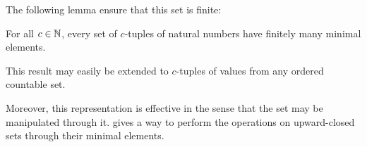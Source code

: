 The following lemma ensure that this set is finite:
\begin{lemm}
  \label{theo:dickson}
  For all $c \in \mathbb{N}$, every set of $c$-tuples of natural numbers have finitely many minimal elements.
\end{lemm}
This result may easily be extended to $c$-tuples of values from any ordered countable set.

Moreover, this representation is effective in the sense that the set may be manipulated through it.
\cite{Ganty09} gives a way to perform the operations on upward-closed sets through their minimal elements.

%
%
%
%
%
%
%
%
%
